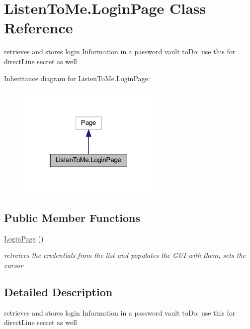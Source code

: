 \hypertarget{class_listen_to_me_1_1_login_page}{}\section{Listen\+To\+Me.\+Login\+Page Class Reference}
\label{class_listen_to_me_1_1_login_page}


retrieves and stores login Information in a password vault to\+Do\+: use this for direct\+Line secret as well  




Inheritance diagram for Listen\+To\+Me.\+Login\+Page\+:\nopagebreak
\begin{figure}[H]
\begin{center}
\leavevmode
\includegraphics[width=196pt]{class_listen_to_me_1_1_login_page__inherit__graph}
\end{center}
\end{figure}
\subsection*{Public Member Functions}
\begin{DoxyCompactItemize}
\item 
\hyperlink{class_listen_to_me_1_1_login_page_afcefc5f9f4f5cee5d9f5e15493e4058b}{Login\+Page} ()
\begin{DoxyCompactList}\small\item\em retreives the credentials from the list and populates the G\+UI with them, sets the cursor \end{DoxyCompactList}\end{DoxyCompactItemize}


\subsection{Detailed Description}
retrieves and stores login Information in a password vault to\+Do\+: use this for direct\+Line secret as well 



